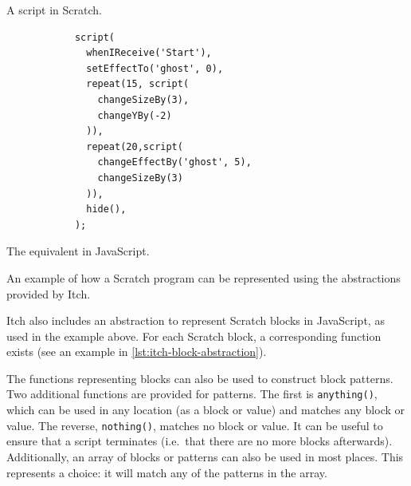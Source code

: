 \documentclass[../main]{subfiles}
\begin{document}
\begin{listing}
    \begin{wide}
        \begin{sublisting}{0.49\linewidth}
            \begin{scratch}[scale=0.7]
                {
                }
                {
                }

            \end{scratch}
            \caption{A script in Scratch.}
        \end{sublisting}
        \begin{sublisting}{0.5\linewidth}
            \begin{verbatim}
            script(
              whenIReceive('Start'),
              setEffectTo('ghost', 0),
              repeat(15, script(
                changeSizeBy(3),
                changeYBy(-2)
              )),
              repeat(20,script(
                changeEffectBy('ghost', 5),
                changeSizeBy(3)
              )),
              hide(),
            );
            \end{verbatim}
            \caption{The equivalent in JavaScript.}
        \end{sublisting}
    \end{wide}
    \caption{An example of how a Scratch program can be represented using the abstractions provided by Itch.}\label{lst:itch-block-abstraction}
\end{listing}

Itch also includes an abstraction to represent Scratch blocks in JavaScript, as used in the example above.
For each Scratch block, a corresponding function exists (see an example in \cref{lst:itch-block-abstraction}).

The functions representing blocks can also be used to construct block patterns.
Two additional functions are provided for patterns.
The first is \texttt{anything()}, which can be used in any location (as a block or value) and matches any block or value.
The reverse, \texttt{nothing()}, matches no block or value.
It can be useful to ensure that a script terminates (i.e.\ that there are no more blocks afterwards).
Additionally, an array of blocks or patterns can also be used in most places.
This represents a choice: it will match any of the patterns in the array.
\end{document}
